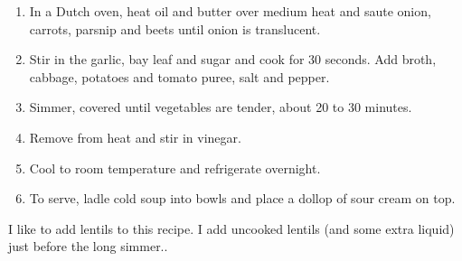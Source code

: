 \prep{}

\begin{ingredients}
\end{ingredients}


\begin{recipe}
  \begin{enumerate}
  \item   In a Dutch oven, heat oil and butter over medium heat and saute
      onion, carrots, parsnip and beets until onion is translucent.

   \item Stir in the garlic, bay leaf and sugar and cook for 30
      seconds. Add broth, cabbage, potatoes and tomato puree, salt and
      pepper.

   \item Simmer, covered until vegetables are tender, about 20 to 30
      minutes.

   \item Remove from heat and stir in vinegar.

   \item Cool to room temperature and refrigerate overnight.

   \item To serve, ladle cold soup into bowls and place a dollop of sour
      cream on top.

  \end{enumerate}
  
  I like to add lentils to this recipe.  I add uncooked lentils (and
  some extra liquid) just before the long simmer..

\end{recipe}
